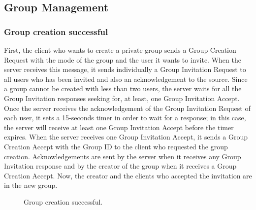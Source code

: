 \documentclass{article}
\begin{document}
\subsection{Group Management}
\subsubsection{Group creation successful}
First, the client who wants to create a private group sends a Group Creation Request with the mode of the group and the user it wants to invite. When the server receives this message, it sends individually a Group Invitation Request to all users who has been invited and also an acknowledgement to the source. Since a group cannot be created with less than two users, the server waits for all the Group Invitation responses seeking for, at least, one Group Invitation Accept. Once the server receives the acknowledgement of the Group Invitation Request of each user, it sets a 15-seconds timer in order to wait for a response; in this case, the server will receive at least one Group Invitation Accept before the timer expires. When the server receives one Group Invitation Accept, it sends a Group Creation Accept with the Group ID to the client who requested the group creation. Acknowledgements are sent by the server when it receives any Group Invitation response and by the creator of the group when it receives a Group Creation Accept. Now, the creator and the clients who accepted the invitation are in the new group.

\begin{figure}[H]
    \centering
    \begin{sequencediagram}

    \end{sequencediagram}
    \caption{Group creation successful.}
\end{figure}
\end{document}
